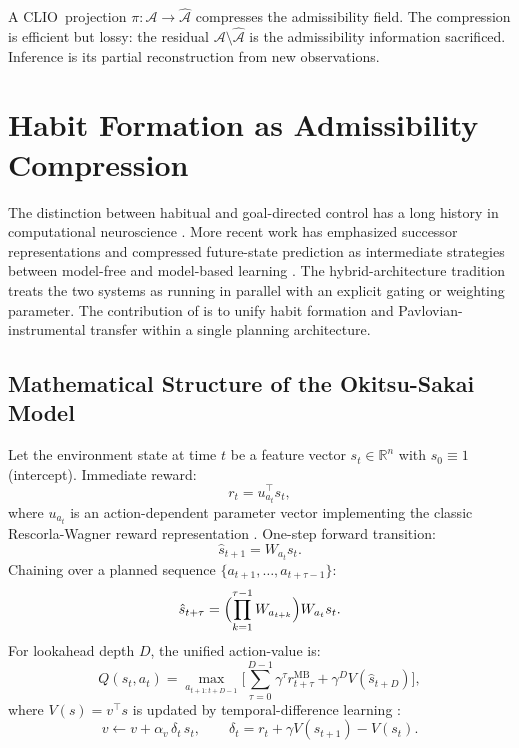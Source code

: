 \documentclass[12pt, a4paper, twoside]{book}
\theoremstyle{definition}
\theoremstyle{remark}
\newcommand{\Adm}{\mathcal{A}}
\newcommand{\CLIO}{\textsf{CLIO}}
\begin{document}
A \CLIO\ projection $\pi: \Adm \to \hat{\Adm}$ compresses the admissibility field. The compression is efficient but lossy: the residual $\Adm \setminus \hat{\Adm}$ is the admissibility information sacrificed. Inference is its partial reconstruction from new observations.

\section{Habit Formation as Admissibility Compression}

The distinction between habitual and goal-directed control has a long history in computational neuroscience \citep{dayanballeine2002, keramati2011, dezfouli2014, balleine2010}. More recent work has emphasized successor representations and compressed future-state prediction as intermediate strategies between model-free and model-based learning \citep{momennejad2017, gershman2017}. The hybrid-architecture tradition treats the two systems as running in parallel with an explicit gating or weighting parameter. The contribution of \citet{okitsu2026} is to unify habit formation and Pavlovian-instrumental transfer within a single planning architecture.

\subsection{Mathematical Structure of the Okitsu-Sakai Model}

Let the environment state at time $t$ be a feature vector $s_t \in \mathbb{R}^n$ with $s_0 \equiv 1$ (intercept). Immediate reward:
\begin{equation}
  r_t = u_{a_t}^\top s_t,
\end{equation}
where $u_{a_t}$ is an action-dependent parameter vector implementing the classic Rescorla-Wagner reward representation \citep{rescorla1972}. One-step forward transition:
\begin{equation}
  \hat{s}_{t+1} = W_{a_t} s_t.
\end{equation}
Chaining over a planned sequence $\{a_{t+1},\ldots,a_{t+\tau-1}\}$:
\begin{equation}
  \hat{s}_{t+\tau} = \Bigl(\prod_{k=1}^{\tau-1} W_{a_{t+k}}\Bigr) W_{a_t} s_t.
\end{equation}
For lookahead depth $D$, the unified action-value is:
\begin{equation}
  Q(s_t, a_t) = \max_{a_{t+1:t+D-1}} \Biggl[\sum_{\tau=0}^{D-1} \gamma^\tau r_{t+\tau}^{\mathrm{MB}} + \gamma^D V(\hat{s}_{t+D})\Biggr],
\end{equation}
where $V(s) = v^\top s$ is updated by temporal-difference learning \citep{suttonbarto2018}:
\begin{equation}
  v \leftarrow v + \alpha_v\,\delta_t\, s_t, \qquad \delta_t = r_t + \gamma V(s_{t+1}) - V(s_t).
\end{equation}
\end{document}
